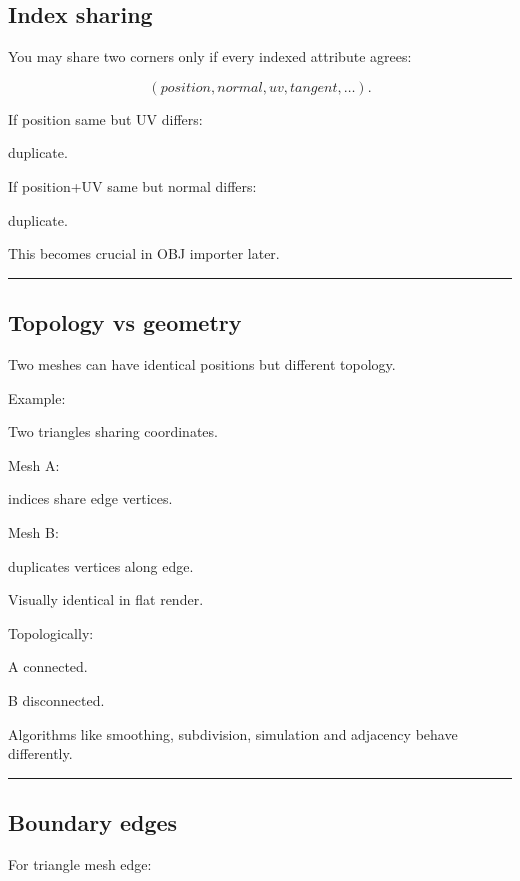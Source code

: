 \subsection{Index sharing}\label{04-visual-computing-ii-ch041-index-sharing}

You may share two corners only if every indexed attribute agrees:

\[
(position,normal,uv,tangent,\ldots).
\]

If position same but UV differs:

duplicate.

If position+UV same but normal differs:

duplicate.

This becomes crucial in OBJ importer later.

\begin{center}\rule{0.5\linewidth}{0.5pt}\end{center}

\subsection{Topology vs geometry}\label{04-visual-computing-ii-ch041-topology-vs-geometry}

Two meshes can have identical positions but different topology.

Example:

Two triangles sharing coordinates.

Mesh A:

indices share edge vertices.

Mesh B:

duplicates vertices along edge.

Visually identical in flat render.

Topologically:

A connected.

B disconnected.

Algorithms like smoothing, subdivision, simulation and adjacency behave differently.

\begin{center}\rule{0.5\linewidth}{0.5pt}\end{center}

\subsection{Boundary edges}\label{04-visual-computing-ii-ch041-boundary-edges}

For triangle mesh edge:

